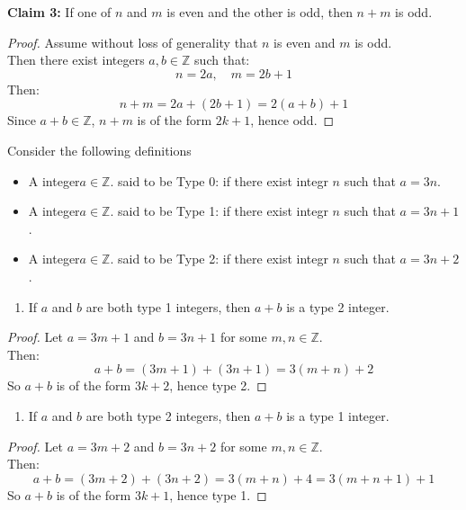 \documentclass[
]{book}
\providecommand{\tightlist}{%
  \setlength{\itemsep}{0pt}\setlength{\parskip}{0pt}}
\theoremstyle{definition}
\theoremstyle{definition}
\theoremstyle{definition}
\theoremstyle{definition}
\theoremstyle{remark}
\begin{document}
\textbf{Claim 3:} If one of \(n\) and \(m\) is even and the other is odd, then \(n + m\) is odd.

\begin{proof}
Assume without loss of generality that \(n\) is even and \(m\) is odd.\\
Then there exist integers \(a, b \in \mathbb{Z}\) such that:
\[
n = 2a,\quad m = 2b + 1
\]
Then:
\[
n + m = 2a + (2b + 1) = 2(a + b) + 1
\]
Since \(a + b \in \mathbb{Z}\), \(n + m\) is of the form \(2k + 1\), hence odd.
\end{proof}

Consider the following definitions

\begin{itemize}
\tightlist
\item
  A integer\(a \in \mathbb{Z}\). said to be Type 0: if there exist integr \(n\) such that \(a = 3n\).
\item
  A integer\(a \in \mathbb{Z}\). said to be Type 1: if there exist integr \(n\) such that \(a = 3n+1\).
\item
  A integer\(a \in \mathbb{Z}\). said to be Type 2: if there exist integr \(n\) such that \(a = 3n+2\).
\end{itemize}

\begin{enumerate}
\def\labelenumi{(\roman{enumi})}
\tightlist
\item
  If \(a\) and \(b\) are both type 1 integers, then \(a + b\) is a type 2 integer.
\end{enumerate}

\begin{proof}
Let \(a = 3m + 1\) and \(b = 3n + 1\) for some \(m, n \in \mathbb{Z}\).\\
Then:
\[
a + b = (3m + 1) + (3n + 1) = 3(m + n) + 2
\]
So \(a + b\) is of the form \(3k + 2\), hence type 2.
\end{proof}

\begin{enumerate}
\def\labelenumi{(\roman{enumi})}
\setcounter{enumi}{1}
\tightlist
\item
  If \(a\) and \(b\) are both type 2 integers, then \(a + b\) is a type 1 integer.
\end{enumerate}

\begin{proof}
Let \(a = 3m + 2\) and \(b = 3n + 2\) for some \(m, n \in \mathbb{Z}\).\\
Then:
\[
a + b = (3m + 2) + (3n + 2) = 3(m + n) + 4 = 3(m + n + 1) + 1
\]
So \(a + b\) is of the form \(3k + 1\), hence type 1.
\end{proof}
\end{document}
